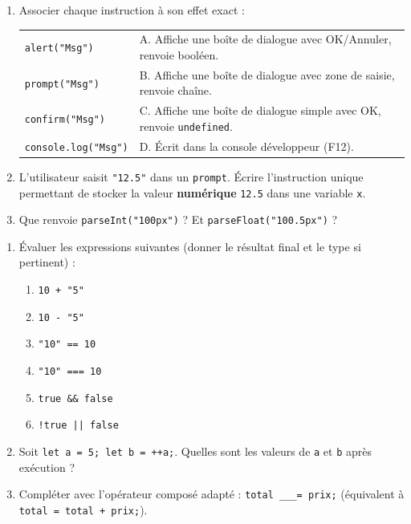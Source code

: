 \documentclass[11pt]{article}
\begin{document}
\begin{exercice}
\begin{enumerate}
    \item Associer chaque instruction à son effet exact :
    \begin{tabular}{ll}
    \texttt{alert("Msg")}      & A. Affiche une boîte de dialogue avec OK/Annuler, renvoie booléen. \\
    \texttt{prompt("Msg")}     & B. Affiche une boîte de dialogue avec zone de saisie, renvoie chaîne. \\
    \texttt{confirm("Msg")}    & C. Affiche une boîte de dialogue simple avec OK, renvoie \texttt{undefined}. \\
    \texttt{console.log("Msg")}& D. Écrit dans la console développeur (F12).
    \end{tabular}
    \item L'utilisateur saisit \texttt{"12.5"} dans un \texttt{prompt}. Écrire l'instruction unique permettant de stocker la valeur \textbf{numérique} \texttt{12.5} dans une variable \texttt{x}.
    \item Que renvoie \texttt{parseInt("100px")} ? Et \texttt{parseFloat("100.5px")} ?
\end{enumerate}
\end{exercice}

\begin{exercice}
\begin{enumerate}
    \item Évaluer les expressions suivantes (donner le résultat final et le type si pertinent) :
\begin{enumerate}
        \item \texttt{10 + "5"}
        \item \texttt{10 - "5"}
        \item \texttt{"10" == 10}
        \item \texttt{"10" === 10}
        \item \texttt{true \&\& false}
        \item \texttt{!true || false}
    \end{enumerate}
    \item Soit \texttt{let a = 5; let b = ++a;}. Quelles sont les valeurs de \texttt{a} et \texttt{b} après exécution ?
    \item Compléter avec l'opérateur composé adapté : \texttt{total \_\_\_= prix;} (équivalent à \texttt{total = total + prix;}).
\end{enumerate}
\end{exercice}
\end{document}
